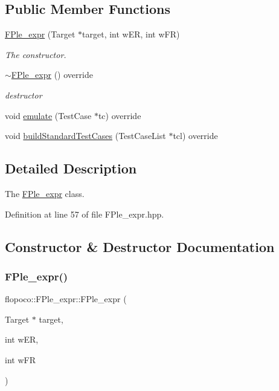 \subsection*{Public Member Functions}
\begin{DoxyCompactItemize}
\item 
\hyperlink{classflopoco_1_1FPle__expr_a797433a6d76f3b021fb9856346e5d2c9}{F\+Ple\+\_\+expr} (Target $\ast$target, int w\+ER, int w\+FR)
\begin{DoxyCompactList}\small\item\em The constructor. \end{DoxyCompactList}\item 
\hyperlink{classflopoco_1_1FPle__expr_a16703f83d631965406af69ad19d51f3e}{$\sim$\+F\+Ple\+\_\+expr} () override
\begin{DoxyCompactList}\small\item\em destructor \end{DoxyCompactList}\item 
void \hyperlink{classflopoco_1_1FPle__expr_aba8c39a1a39c0b073acc16df66b5a836}{emulate} (Test\+Case $\ast$tc) override
\item 
void \hyperlink{classflopoco_1_1FPle__expr_a96406849979dae35af1d76bc72caa5e1}{build\+Standard\+Test\+Cases} (Test\+Case\+List $\ast$tcl) override
\end{DoxyCompactItemize}


\subsection{Detailed Description}
The \hyperlink{classflopoco_1_1FPle__expr}{F\+Ple\+\_\+expr} class. 

Definition at line 57 of file F\+Ple\+\_\+expr.\+hpp.



\subsection{Constructor \& Destructor Documentation}
\mbox{\label{classflopoco_1_1FPle__expr_a797433a6d76f3b021fb9856346e5d2c9}} 
\subsubsection{\texorpdfstring{F\+Ple\+\_\+expr()}{FPle\_expr()}}
{\footnotesize\ttfamily flopoco\+::\+F\+Ple\+\_\+expr\+::\+F\+Ple\+\_\+expr (\begin{DoxyParamCaption}\item[{Target $\ast$}]{target,  }\item[{int}]{w\+ER,  }\item[{int}]{w\+FR }\end{DoxyParamCaption})}



